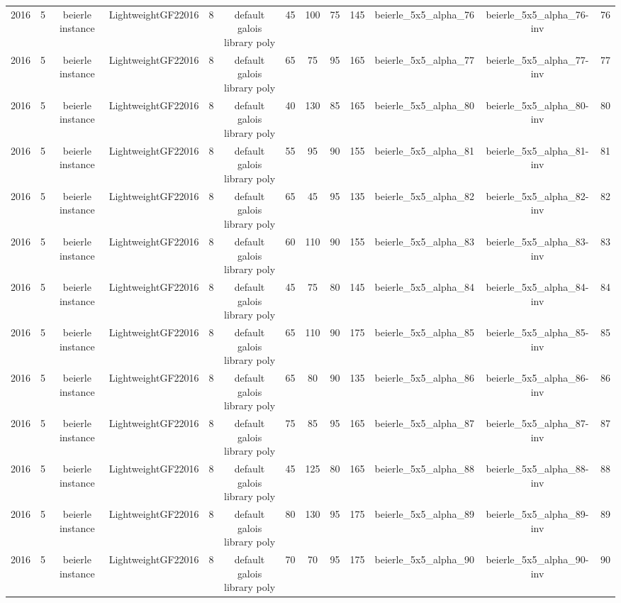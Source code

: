 \begin{tabular}{c c c c c c c c c c c c c}
2016 & 5 & beierle instance & LightweightGF22016 & 8 & default galois library poly & 45 & 100 & 75 & 145 & beierle_5x5_alpha_76 & beierle_5x5_alpha_76-inv & 76 \\
2016 & 5 & beierle instance & LightweightGF22016 & 8 & default galois library poly & 65 & 75 & 95 & 165 & beierle_5x5_alpha_77 & beierle_5x5_alpha_77-inv & 77 \\
2016 & 5 & beierle instance & LightweightGF22016 & 8 & default galois library poly & 40 & 130 & 85 & 165 & beierle_5x5_alpha_80 & beierle_5x5_alpha_80-inv & 80 \\
2016 & 5 & beierle instance & LightweightGF22016 & 8 & default galois library poly & 55 & 95 & 90 & 155 & beierle_5x5_alpha_81 & beierle_5x5_alpha_81-inv & 81 \\
2016 & 5 & beierle instance & LightweightGF22016 & 8 & default galois library poly & 65 & 45 & 95 & 135 & beierle_5x5_alpha_82 & beierle_5x5_alpha_82-inv & 82 \\
2016 & 5 & beierle instance & LightweightGF22016 & 8 & default galois library poly & 60 & 110 & 90 & 155 & beierle_5x5_alpha_83 & beierle_5x5_alpha_83-inv & 83 \\
2016 & 5 & beierle instance & LightweightGF22016 & 8 & default galois library poly & 45 & 75 & 80 & 145 & beierle_5x5_alpha_84 & beierle_5x5_alpha_84-inv & 84 \\
2016 & 5 & beierle instance & LightweightGF22016 & 8 & default galois library poly & 65 & 110 & 90 & 175 & beierle_5x5_alpha_85 & beierle_5x5_alpha_85-inv & 85 \\
2016 & 5 & beierle instance & LightweightGF22016 & 8 & default galois library poly & 65 & 80 & 90 & 135 & beierle_5x5_alpha_86 & beierle_5x5_alpha_86-inv & 86 \\
2016 & 5 & beierle instance & LightweightGF22016 & 8 & default galois library poly & 75 & 85 & 95 & 165 & beierle_5x5_alpha_87 & beierle_5x5_alpha_87-inv & 87 \\
2016 & 5 & beierle instance & LightweightGF22016 & 8 & default galois library poly & 45 & 125 & 80 & 165 & beierle_5x5_alpha_88 & beierle_5x5_alpha_88-inv & 88 \\
2016 & 5 & beierle instance & LightweightGF22016 & 8 & default galois library poly & 80 & 130 & 95 & 175 & beierle_5x5_alpha_89 & beierle_5x5_alpha_89-inv & 89 \\
2016 & 5 & beierle instance & LightweightGF22016 & 8 & default galois library poly & 70 & 70 & 95 & 175 & beierle_5x5_alpha_90 & beierle_5x5_alpha_90-inv & 90 \\

\end{tabular}
